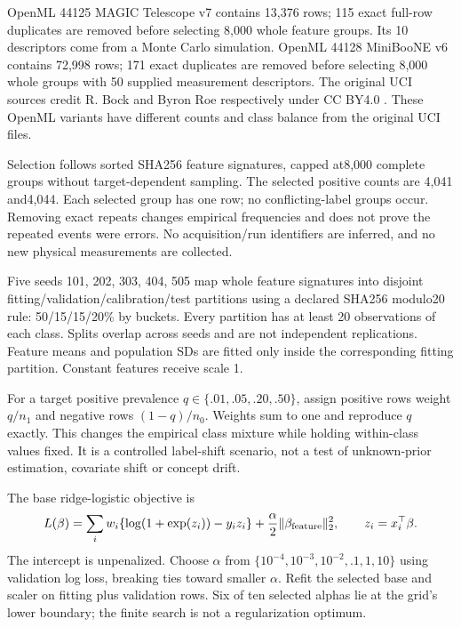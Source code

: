 \documentclass[10pt]{article}
\newcommand{\smallhead}[1]{\vspace{6pt}{\large\bfseries #1}\par}
\begin{document}
\smallhead{Exact sources and populations}
OpenML 44125 MAGIC Telescope v7 contains 13,376 rows; 115 exact full-row duplicates are removed before selecting 8,000 whole feature groups. Its 10 descriptors come from a Monte Carlo simulation. OpenML 44128 MiniBooNE v6 contains 72,998 rows; 171 exact duplicates are removed before selecting 8,000 whole groups with 50 supplied measurement descriptors. The original UCI sources credit R. Bock and Byron Roe respectively under CC BY4.0 \cite{magic,miniboone}. These OpenML variants have different counts and class balance from the original UCI files.

Selection follows sorted SHA256 feature signatures, capped at8,000 complete groups without target-dependent sampling. The selected positive counts are 4,041 and4,044. Each selected group has one row; no conflicting-label groups occur. Removing exact repeats changes empirical frequencies and does not prove the repeated events were errors. No acquisition/run identifiers are inferred, and no new physical measurements are collected.
\newpage

\smallhead{Protected fitting and controlled mixtures}
Five seeds 101, 202, 303, 404, 505 map whole feature signatures into disjoint fitting/validation/calibration/test partitions using a declared SHA256 modulo20 rule: 50/15/15/20\% by buckets. Every partition has at least 20 observations of each class. Splits overlap across seeds and are not independent replications. Feature means and population SDs are fitted only inside the corresponding fitting partition. Constant features receive scale 1.

For a target positive prevalence $q\in\{.01,.05,.20,.50\}$, assign positive rows weight $q/n_1$ and negative rows $(1-q)/n_0$. Weights sum to one and reproduce $q$ exactly. This changes the empirical class mixture while holding within-class values fixed. It is a controlled label-shift scenario, not a test of unknown-prior estimation, covariate shift or concept drift.

The base ridge-logistic objective is
\[
 L(\beta)=\sum_i w_i\{\log(1+\exp(z_i))-y_i z_i\}
       +\frac{\alpha}{2}\|\beta_{\rm feature}\|_2^2,\qquad
 z_i=x_i^\top\beta .
\]
The intercept is unpenalized. Choose $\alpha$ from
$\{10^{-4},10^{-3},10^{-2},.1,1,10\}$ using validation log loss, breaking ties toward smaller $\alpha$. Refit the selected base and scaler on fitting plus validation rows. Six of ten selected alphas lie at the grid's lower boundary; the finite search is not a regularization optimum.
\end{document}
